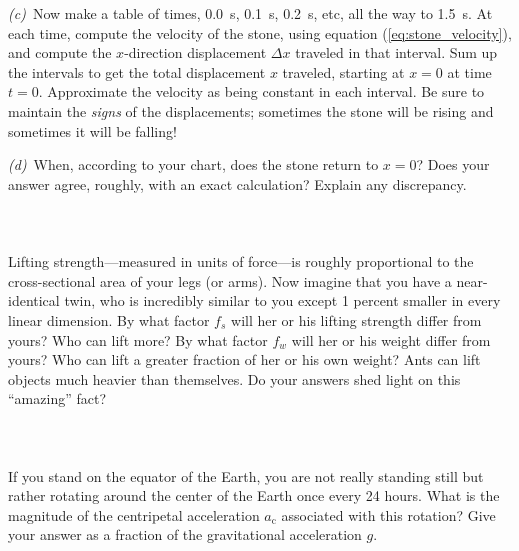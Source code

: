 \documentclass[12pt]{article}
\newcounter{problem}
\begin{document}
\textsl{(c)}~Now make a table of times, 0.0~s, 0.1~s, 0.2~s, etc, all
the way to 1.5~s.  At each time, compute the velocity of the stone,
using equation (\ref{eq:stone_velocity}), and compute the
$x$-direction displacement $\Delta x$ traveled in that interval.  Sum
up the intervals to get the total displacement $x$ traveled, starting
at $x=0$ at time $t=0$.  Approximate the velocity as being constant in
each interval.  Be sure to maintain the \emph{signs} of the
displacements; sometimes the stone will be rising and sometimes it
will be falling!

\textsl{(d)}~When, according to your chart, does the stone return to
$x=0$?  Does your answer agree, roughly, with an exact calculation?
Explain any discrepancy.

\paragraph{\problemname~\theproblem}

Lifting strength---measured in units of force---is roughly
proportional to the cross-sectional area of your legs (or arms).  Now
imagine that you have a near-identical twin, who is incredibly similar
to you except 1 percent smaller in every linear dimension.  By what
factor $f_s$ will her or his lifting strength differ from yours?  Who
can lift more?  By what factor $f_w$ will her or his weight differ
from yours?  Who can lift a greater fraction of her or his own weight?
Ants can lift objects much heavier than themselves.  Do your answers
shed light on this ``amazing'' fact?

\paragraph{\problemname~\theproblem}

If you stand on the equator of the Earth, you are not really standing
still but rather rotating around the center of the Earth once every 24
hours.  What is the magnitude of the centripetal acceleration
$a_\mathrm{c}$ associated with this rotation?  Give your answer as a
fraction of the gravitational acceleration $g$.

\paragraph{\problemname~\theproblem}
\end{document}

